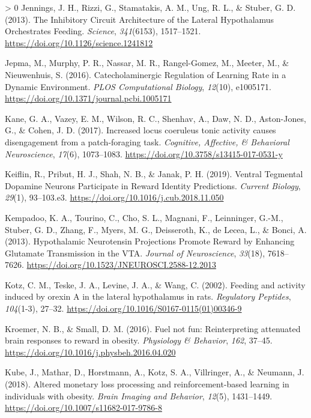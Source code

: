 \documentclass[
]{/home/nicoluarte/Downloads/templates/PNAS-template-main.tex}
\newlength{\cslhangindent}
\newenvironment{CSLReferences}[3] %
 {%
  \setlength{\parindent}{0pt}
  \ifodd #1 \everypar{\setlength{\hangindent}{\cslhangindent}}\ignorespaces\fi
  \ifnum #2 > 0
  \setlength{\parskip}{#2\baselineskip}
  \fi
 }%
 {}
\begin{document}
\begin{CSLReferences}{1}{0}
\leavevmode\hypertarget{ref-2ZT7CAFB}{}%
Jennings, J. H., Rizzi, G., Stamatakis, A. M., Ung, R. L., \& Stuber, G.
D. (2013). The Inhibitory Circuit Architecture of the Lateral
Hypothalamus Orchestrates Feeding. \emph{Science}, \emph{341}(6153),
1517--1521. \url{https://doi.org/10.1126/science.1241812}

\leavevmode\hypertarget{ref-LIRXSMKQ}{}%
Jepma, M., Murphy, P. R., Nassar, M. R., Rangel-Gomez, M., Meeter, M.,
\& Nieuwenhuis, S. (2016). Catecholaminergic Regulation of Learning Rate
in a Dynamic Environment. \emph{PLOS Computational Biology},
\emph{12}(10), e1005171.
\url{https://doi.org/10.1371/journal.pcbi.1005171}

\leavevmode\hypertarget{ref-KA4Y29AG}{}%
Kane, G. A., Vazey, E. M., Wilson, R. C., Shenhav, A., Daw, N. D.,
Aston-Jones, G., \& Cohen, J. D. (2017). Increased locus coeruleus tonic
activity causes disengagement from a patch-foraging task.
\emph{Cognitive, Affective, \& Behavioral Neuroscience}, \emph{17}(6),
1073--1083. \url{https://doi.org/10.3758/s13415-017-0531-y}

\leavevmode\hypertarget{ref-E6MZ8HIA}{}%
Keiflin, R., Pribut, H. J., Shah, N. B., \& Janak, P. H. (2019). Ventral
Tegmental Dopamine Neurons Participate in Reward Identity Predictions.
\emph{Current Biology}, \emph{29}(1), 93--103.e3.
\url{https://doi.org/10.1016/j.cub.2018.11.050}

\leavevmode\hypertarget{ref-P8YAF6NZ}{}%
Kempadoo, K. A., Tourino, C., Cho, S. L., Magnani, F., Leinninger,
G.-M., Stuber, G. D., Zhang, F., Myers, M. G., Deisseroth, K., de Lecea,
L., \& Bonci, A. (2013). Hypothalamic Neurotensin Projections Promote
Reward by Enhancing Glutamate Transmission in the VTA. \emph{Journal of
Neuroscience}, \emph{33}(18), 7618--7626.
\url{https://doi.org/10.1523/JNEUROSCI.2588-12.2013}

\leavevmode\hypertarget{ref-TPGJBDDD}{}%
Kotz, C. M., Teske, J. A., Levine, J. A., \& Wang, C. (2002). Feeding
and activity induced by orexin A in the lateral hypothalamus in rats.
\emph{Regulatory Peptides}, \emph{104}(1-3), 27--32.
\url{https://doi.org/10.1016/S0167-0115(01)00346-9}

\leavevmode\hypertarget{ref-GU4KJGAS}{}%
Kroemer, N. B., \& Small, D. M. (2016). Fuel not fun: Reinterpreting
attenuated brain responses to reward in obesity. \emph{Physiology \&
Behavior}, \emph{162}, 37--45.
\url{https://doi.org/10.1016/j.physbeh.2016.04.020}

\leavevmode\hypertarget{ref-PE46B3Z8}{}%
Kube, J., Mathar, D., Horstmann, A., Kotz, S. A., Villringer, A., \&
Neumann, J. (2018). Altered monetary loss processing and
reinforcement-based learning in individuals with obesity. \emph{Brain
Imaging and Behavior}, \emph{12}(5), 1431--1449.
\url{https://doi.org/10.1007/s11682-017-9786-8}


\end{CSLReferences}
\end{document}
